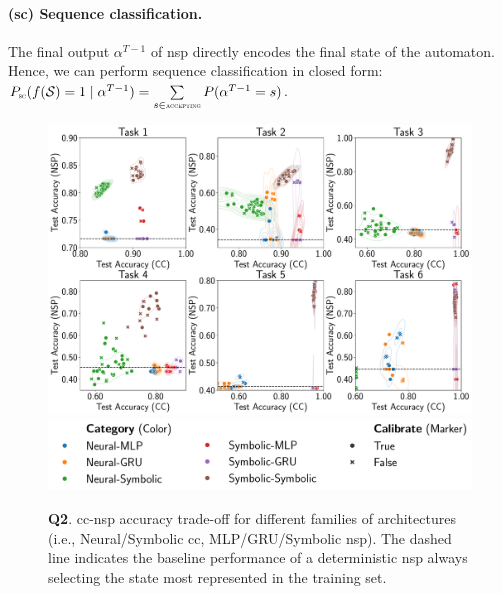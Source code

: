 
\paragraph{{\sc (sc)} Sequence classification.} The final output $\alpha^{T-1}$ of {\sc nsp} directly encodes the final state of the automaton. Hence, we can perform sequence classification in closed form: $P_{\text{\sc\tiny sc}}(f(\mathcal{S}) = 1 \mid \alpha^{T-1}) = \sum\limits_{s \in \text{\sc\tiny accepting}} P(\alpha^{T-1} = s)$. %

\begin{figure}
\centering
\includegraphics[width=1.0\textwidth]{imgs/ijcai/const-vs-succ.pdf}
\includegraphics[width=1.0\textwidth]{imgs/ijcai/const-vs-succ_legend.pdf}
\caption[\textsc{cc}--\textsc{nsp} trade-off on LTLZinc-Short (rejection sampling)]{\textbf{Q2}. {\sc cc}-{\sc nsp} accuracy trade-off for different families of architectures (i.e., Neural/Symbolic {\sc cc}, MLP/GRU/Symbolic {\sc nsp}). The dashed line indicates the baseline performance of a deterministic {\sc nsp} always selecting the state most represented in the training set.} %
\label{ijcai:fig:main}
\end{figure}
